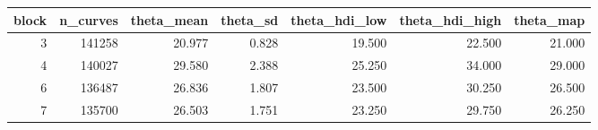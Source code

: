 \begin{tabular}{rrrrrrr}
\toprule
block & n_curves & theta_mean & theta_sd & theta_hdi_low & theta_hdi_high & theta_map \\
\midrule
3 & 141258 & 20.977 & 0.828 & 19.500 & 22.500 & 21.000 \\
4 & 140027 & 29.580 & 2.388 & 25.250 & 34.000 & 29.000 \\
6 & 136487 & 26.836 & 1.807 & 23.500 & 30.250 & 26.500 \\
7 & 135700 & 26.503 & 1.751 & 23.250 & 29.750 & 26.250 \\
\bottomrule
\end{tabular}
